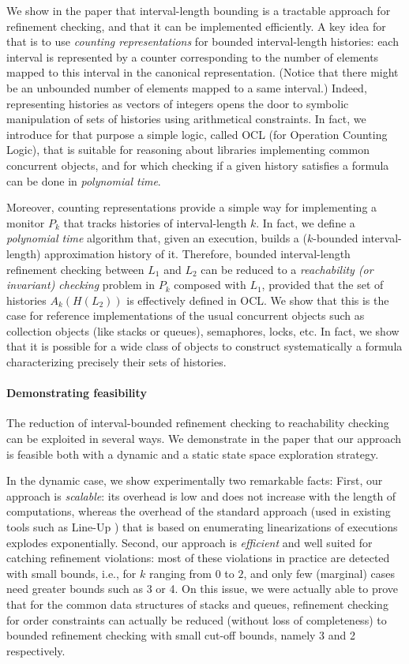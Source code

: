 We show in the paper that interval-length bounding is a tractable approach for
refinement checking, and that it can be implemented efficiently. A key idea for
that is to use \emph{counting representations} for bounded interval-length
histories: each interval is represented by a counter corresponding to the
number of elements mapped to this interval in the canonical representation.
(Notice that there might be an unbounded number of elements mapped to a same
interval.) Indeed, representing histories as vectors of integers opens the door
to symbolic manipulation of sets of histories using arithmetical constraints.
In fact, we introduce for that purpose a simple logic, called OCL (for
Operation Counting Logic), that is suitable for reasoning about libraries
implementing common concurrent objects, and for which checking if a given
history satisfies a formula can be done in \emph{polynomial time}.

Moreover, counting representations provide a simple way for implementing a
monitor $P_k$ that tracks histories of interval-length $k$. In fact, we define
a \emph{polynomial time} algorithm that, given an execution, builds a
($k$-bounded interval-length) approximation history of it. Therefore, bounded
interval-length refinement checking between $L_1$ and $L_2$ can be reduced to a
\emph{reachability (or invariant) checking} problem in $P_k$ composed with
$L_1$, provided that the set of histories $A_k(H(L_2))$ is effectively defined
in OCL. We show that this is the case for reference implementations of the
usual concurrent objects such as collection objects (like stacks or queues),
semaphores, locks, etc. In fact, we show that it is possible for a wide class
of objects to construct systematically a formula characterizing precisely their
sets of histories.

\paragraph{Demonstrating feasibility}

The reduction of interval-bounded refinement checking to reachability checking
can be exploited in several ways. We demonstrate in the paper that our approach
is feasible both with a dynamic and a static state space exploration strategy.

In the dynamic case, we show experimentally two remarkable facts: First, our
approach is \emph{scalable}: its overhead is low and does not increase with the
length of computations, whereas the overhead of the standard approach (used in
existing tools such as Line-Up \cite{}) that is based on enumerating
linearizations of executions explodes exponentially. Second, our approach is
\emph{efficient} and well suited for catching refinement violations: most of
these violations in practice are detected with small bounds, i.e., for $k$
ranging from 0 to $2$, and only few (marginal) cases need greater bounds such
as 3 or 4. On this issue, we were actually able to prove that for the common
data structures of stacks and queues, refinement checking for order constraints
can actually be reduced (without loss of completeness) to bounded refinement
checking with small cut-off bounds, namely 3 and 2 respectively.

